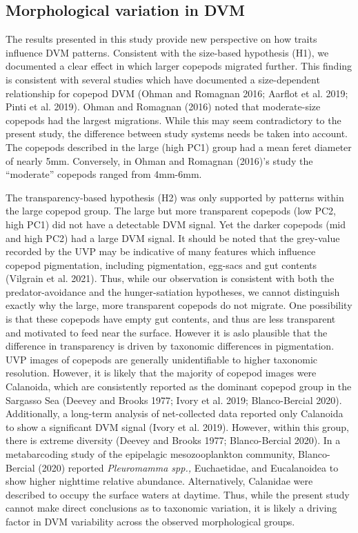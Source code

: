 \documentclass[
]{article}
\begin{document}
\hypertarget{morphological-variation-in-dvm}{%
\subsection{Morphological variation in
DVM}\label{morphological-variation-in-dvm}}

The results presented in this study provide new perspective on how
traits influence DVM patterns. Consistent with the size-based hypothesis
(H1), we documented a clear effect in which larger copepods migrated
further. This finding is consistent with several studies which have
documented a size-dependent relationship for copepod DVM (Ohman and
Romagnan 2016; Aarflot et al. 2019; Pinti et al. 2019). Ohman and
Romagnan (2016) noted that moderate-size copepods had the largest
migrations. While this may seem contradictory to the present study, the
difference between study systems needs be taken into account. The
copepods described in the large (high PC1) group had a mean feret
diameter of nearly 5mm. Conversely, in Ohman and Romagnan (2016)'s study
the ``moderate'' copepods ranged from 4mm-6mm.

The transparency-based hypothesis (H2) was only supported by patterns
within the large copepod group. The large but more transparent copepods
(low PC2, high PC1) did not have a detectable DVM signal. Yet the darker
copepods (mid and high PC2) had a large DVM signal. It should be noted
that the grey-value recorded by the UVP may be indicative of many
features which influence copepod pigmentation, including pigmentation,
egg-sacs and gut contents (Vilgrain et al. 2021). Thus, while our
observation is consistent with both the predator-avoidance and the
hunger-satiation hypotheses, we cannot distinguish exactly why the
large, more transparent copepods do not migrate. One possibility is that
these copepods have empty gut contents, and thus are less transparent
and motivated to feed near the surface. However it is aslo plausible
that the difference in transparency is driven by taxonomic differences
in pigmentation. UVP images of copepods are generally unidentifiable to
higher taxonomic resolution. However, it is likely that the majority of
copepod images were Calanoida, which are consistently reported as the
dominant copepod group in the Sargasso Sea (Deevey and Brooks 1977;
Ivory et al. 2019; Blanco-Bercial 2020). Additionally, a long-term
analysis of net-collected data reported only Calanoida to show a
significant DVM signal (Ivory et al. 2019). However, within this group,
there is extreme diversity (Deevey and Brooks 1977; Blanco-Bercial
2020). In a metabarcoding study of the epipelagic mesozooplankton
community, Blanco-Bercial (2020) reported \emph{Pleuromamma spp.,}
Euchaetidae, and Eucalanoidea to show higher nighttime relative
abundance. Alternatively, Calanidae were described to occupy the surface
waters at daytime. Thus, while the present study cannot make direct
conclusions as to taxonomic variation, it is likely a driving factor in
DVM variability across the observed morphological groups.
\end{document}
